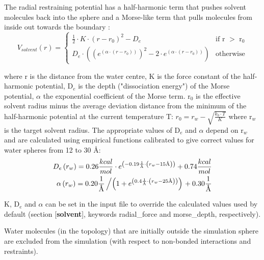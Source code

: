 \documentclass[a4paper,10pt]{article}
\begin{document}
The radial restraining potential has a half-harmonic term that
pushes solvent molecules back into the sphere and a Morse-like
term that pulls molecules from inside out towards the boundary
\cite{Essex:1995}:
\begin {equation}
\label{eq:scaas}
 V_{solvent}(r) = \begin{cases}
    \frac{1}{2}\cdot K \cdot \left( r-r_0 \right) ^2 - D_e & \text{if r $>$ r$_0$} \\
    D_e \cdot \left( \left( e^{ \left( \alpha \cdot \left( r-r_0 \right) \right)} \right)
     ^2 - 2\cdot e^{ \left( \alpha \cdot \left( r-r_0 \right) \right)} \right) & \text{otherwise}
  \end{cases}
\end{equation}

where r is the distance from the water centre, K is the force
constant of the half-harmonic potential, D$_e$ is the depth
("dissociation energy") of the Morse potential, $\alpha$ the
exponential coefficient of the Morse term. r$_0$ is the effective
solvent radius minus the average deviation distance from the
minimum of the half-harmonic potential at the current temperature
T:  $r_0 = r_w - \sqrt{\frac{k_b \cdot T}{K}}$ where r$_w$ is the
target solvent radius. The appropriate values of D$_e$ and
$\alpha$ depend on r$_w$ and are calculated using empirical
functions calibrated to give correct values for water spheres from
12 to 30 \AA:
\begin {equation}
\label {eq:empscaas}
\begin {split}
D_e \left(r_w \right) = 0.26 \frac{kcal}{mol} \cdot e^{\left(
-0.19 \frac{1}{\text{\AA}} \cdot \left( r_w - 15\text{\AA} \right)
\right)} + 0.74
\frac{kcal}{mol} \\
\alpha \left(r_w \right) = 0.20 \frac{1}{\text{\AA}} \left/ \left(1
+ e^{ \left( 0.4 \frac{1}{\text{\AA}} \cdot \left( r_w - 25\text{\AA}
\right) \right)} \right) \right. + 0.30 \frac{1}{\text{\AA}}
\end{split}
\end{equation}

K, D$_e$ and $\alpha$ can be set in the input file to override the
calculated values used by default (section [\textbf{solvent}],
keywords radial\_force and morse\_depth, respectively).

Water molecules (in the topology) that are initially outside the
simulation sphere are excluded from the simulation (with respect
to non-bonded interactions and restraints).
\end{document}
